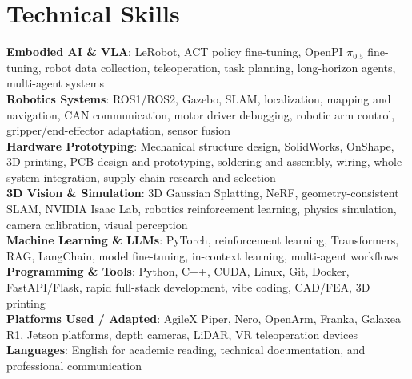 \documentclass[letterpaper,12pt]{article}
\begin{document}
\section{Technical Skills}
 \begin{itemize}[leftmargin=0.15in, label={}]
    \small{\item{
     \textbf{Embodied AI \& VLA}{: LeRobot, ACT policy fine-tuning, OpenPI $\pi_{0.5}$ fine-tuning, robot data collection, teleoperation, task planning, long-horizon agents, multi-agent systems} \\
     \textbf{Robotics Systems}{: ROS1/ROS2, Gazebo, SLAM, localization, mapping and navigation, CAN communication, motor driver debugging, robotic arm control, gripper/end-effector adaptation, sensor fusion} \\
     \textbf{Hardware Prototyping}{: Mechanical structure design, SolidWorks, OnShape, 3D printing, PCB design and prototyping, soldering and assembly, wiring, whole-system integration, supply-chain research and selection} \\
     \textbf{3D Vision \& Simulation}{: 3D Gaussian Splatting, NeRF, geometry-consistent SLAM, NVIDIA Isaac Lab, robotics reinforcement learning, physics simulation, camera calibration, visual perception} \\
     \textbf{Machine Learning \& LLMs}{: PyTorch, reinforcement learning, Transformers, RAG, LangChain, model fine-tuning, in-context learning, multi-agent workflows} \\
     \textbf{Programming \& Tools}{: Python, C++, CUDA, Linux, Git, Docker, FastAPI/Flask, rapid full-stack development, vibe coding, CAD/FEA, 3D printing} \\
     \textbf{Platforms Used / Adapted}{: AgileX Piper, Nero, OpenArm, Franka, Galaxea R1, Jetson platforms, depth cameras, LiDAR, VR teleoperation devices} \\
     \textbf{Languages}{: English for academic reading, technical documentation, and professional communication} \\
    }}
 \end{itemize}
\end{document}

